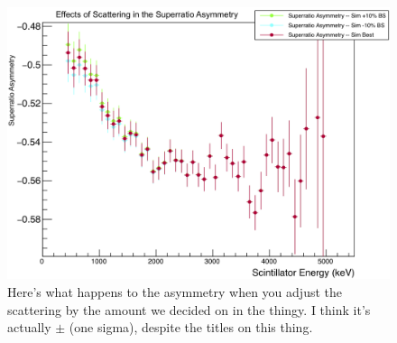 \begin{figure}[h!!!!tb]
	\centering
	\includegraphics[width=.999\linewidth]
	{Figures/ScatteringEstimate.png}
	\caption[Scattering Effects in the Asymmetry]{Here's what happens to the asymmetry when you adjust the scattering by the amount we decided on in the thingy.  I think it's actually $\pm$ (one sigma), despite the titles on this thing.  }	
	\label{fig:asymmetry_scattering}
\end{figure}



